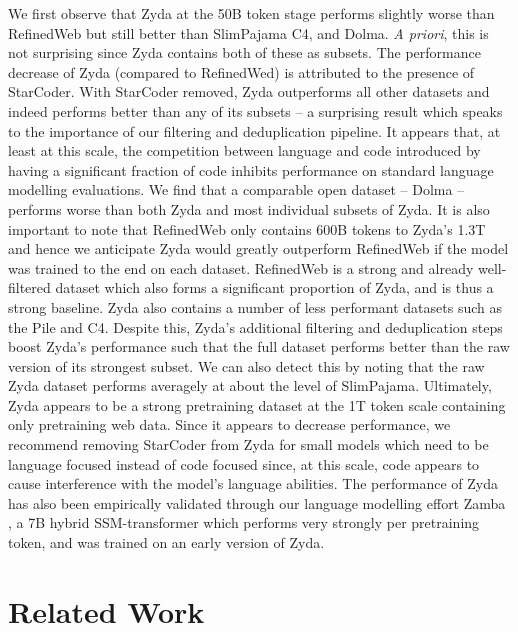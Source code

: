 \documentclass{article}
\begin{document}
We first observe that Zyda at the 50B token stage performs slightly worse than RefinedWeb but still better than SlimPajama C4, and Dolma. \emph{A priori}, this is not surprising since Zyda contains both of these as subsets. The performance decrease of Zyda (compared to RefinedWed) is attributed to the presence of StarCoder. With StarCoder removed, Zyda outperforms all other datasets and indeed performs better than any of its subsets -- a surprising result which speaks to the importance of our filtering and deduplication pipeline. It appears that, at least at this scale, the competition between language and code introduced by having a significant fraction of code inhibits performance on standard language modelling evaluations. We find that a comparable open dataset -- Dolma \cite{soldaini2024dolma} -- performs worse than both Zyda and most individual subsets of Zyda. It is also important to note that RefinedWeb only contains 600B tokens to Zyda's 1.3T and hence we anticipate Zyda would greatly outperform RefinedWeb if the model was trained to the end on each dataset. RefinedWeb is a strong and already well-filtered dataset which also forms a significant proportion of Zyda, and is thus a strong baseline. Zyda also contains a number of less performant datasets such as the Pile and C4. Despite this, Zyda's additional filtering and deduplication steps boost Zyda's performance such that the full dataset performs better than the raw version of its strongest subset. We can also detect this by noting that the raw Zyda dataset performs averagely at about the level of SlimPajama. Ultimately, Zyda appears to be a strong pretraining dataset at the 1T token scale containing only pretraining web data. Since it appears to decrease performance, we recommend removing StarCoder from Zyda for small models which need to be language focused instead of code focused since, at this scale, code appears to cause interference with the model's language abilities. The performance of Zyda has also been empirically validated through our language modelling effort Zamba \citep{glorioso2024zamba}, a 7B hybrid SSM-transformer which performs very strongly per pretraining token, and was trained on an early version of Zyda.

\section{Related Work}
\end{document}
